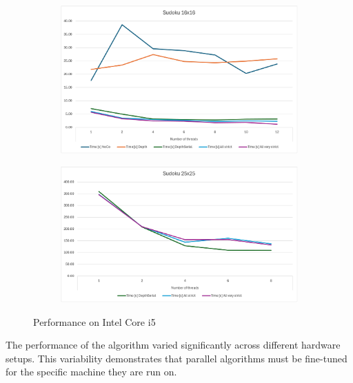 \documentclass[paper=a4, fontsize=12pt]{scrartcl}
\numberwithin{equation}{section}
\numberwithin{figure}{section}
\numberwithin{table}{section}
\begin{document}
    \begin{figure}[!ht]
        \centering
        \begin{subfigure}[b]{0.49\textwidth}
            \centering
            \includegraphics[width=\textwidth]{image16.png} 
        \end{subfigure}
        \hfill
        \begin{subfigure}[b]{0.49\textwidth}
            \centering
            \includegraphics[width=\textwidth]{image25.png} 
        \end{subfigure}
        \caption{Performance on Intel Core i5}
    \end{figure}
    The performance of the algorithm varied significantly across different hardware setups.
    This variability demonstrates that parallel algorithms must be fine-tuned for the specific machine they are run on.
\end{document}
